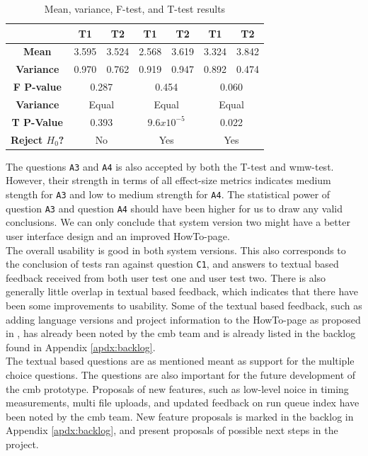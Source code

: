 \begin{table}[t!]
\begin{tabular}{|c||c|c||c|c||c|c||}
      &  T1 & T2 & T1 & T2 & T1 & T2 \\ \hline
      \textbf{Mean} & 3.595 & 3.524 & 2.568 & 3.619 & 3.324 & 3.842 \\ \hline
      \textbf{Variance} & 0.970 & 0.762 & 0.919 & 0.947 & 0.892 & 0.474 \\ \hline
      \textbf{F P-value} & \multicolumn{2}{c||}{0.287} & \multicolumn{2}{c||}{0.454} & \multicolumn{2}{c||}{0.060}\\ \hline
      \textbf{Variance} & \multicolumn{2}{c||}{Equal} & \multicolumn{2}{c||}{Equal} & \multicolumn{2}{c||}{Equal} \\ \hline
      \textbf{T P-Value} & \multicolumn{2}{c||}{0.393} & \multicolumn{2}{c||}{$9.6x10^{-5}$} & \multicolumn{2}{c||}{0.022} \\ \hline
      \textbf{Reject $H_0$?} & \multicolumn{2}{c||}{No} & \multicolumn{2}{c||}{Yes} & \multicolumn{2}{c||}{Yes} \\ \hline
    \end{tabular}
    \caption{Mean, variance, F-test, and T-test results}
    \label{tab:results-tests-all}
\end{table}

The questions \texttt{A3} and \texttt{A4} is also accepted by both the T-test and \gls{wmw}-test. However, their strength in terms of all effect-size metrics indicates medium stength for \texttt{A3} and low to medium strength for \texttt{A4}. The statistical power of question \texttt{A3} and question \texttt{A4} should have been higher for us to draw any valid conclusions. We can only conclude that system version two might have a better user interface design and an improved HowTo-page. \\

The overall usability is good in both system versions. This also corresponds to the conclusion of tests ran against question  \texttt{C1}, and answers to textual based feedback received from both user test one and user test two. There is also generally little overlap in textual based feedback, which indicates that there have been some improvements to usability. Some of the textual based feedback, such as adding language versions and project information to the HowTo-page as proposed in , has already been noted by the \gls{cmb} team and is already listed in the backlog found in Appendix \ref{apdx:backlog}. \\

The textual based questions are as mentioned meant as support for the multiple choice questions. The questions are also important for the future development of the \gls{cmb} prototype. Proposals of new features, such as low-level noice in timing measurements, multi file uploads, and updated feedback on run queue index have been noted by the \gls{cmb} team. New feature proposals is marked in the backlog in Appendix \ref{apdx:backlog}, and  present proposals of possible next steps in the project. \\

